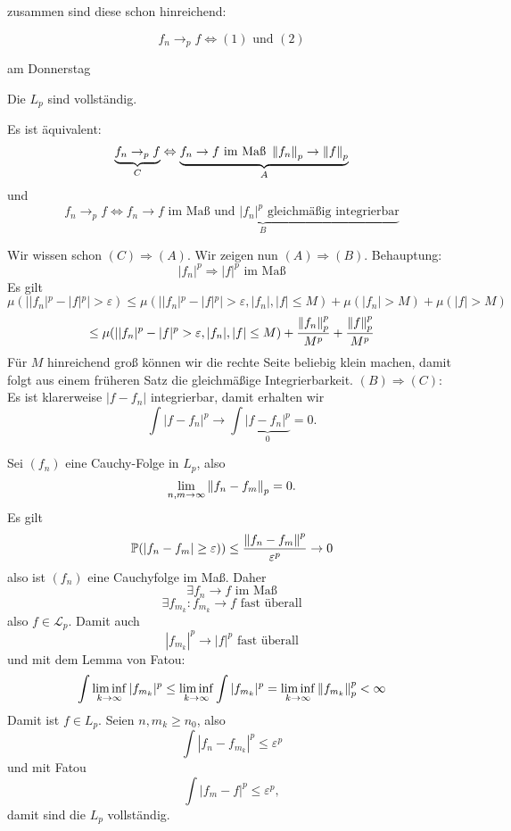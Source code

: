 	zusammen sind diese schon hinreichend:
	\begin{satz}
		\[ f_n\to_p f\Leftrightarrow (1)\text{ und }(2) \]
	\end{satz}

	\begin{bew}
		am Donnerstag
	\end{bew}

	\begin{satz} 
		Die $L_p$ sind vollständig. 
	\end{satz}

	\begin{satz} 
		Es ist äquivalent:
		\[ \underbrace{f_n\to_p f}_C\Leftrightarrow \underbrace{f_n\to f\text{ im Maß } \left\|f_n\right\|_p\to\left\|f\right\|_p}_A \]
		und
		\[ f_n\to_p f\Leftrightarrow \underbrace{f_n \to f\text{ im Maß und } |f_n|^p \text{ gleichmäßig integrierbar}}_B \]
	\end{satz}

	\begin{bew}
		Wir wissen schon $(C)\Rightarrow (A)$. \newline
		Wir zeigen nun $(A)\Rightarrow (B)$. \newline
		Behauptung: 
		\[ |f_n|^p\Rightarrow |f|^p \text{ im Maß} \]
		Es gilt
		\[ \mu(||f_n|^p-|f|^p|>\varepsilon)\le\mu(||f_n|^p-|f|^p|>\varepsilon, |f_n|, |f|\le M)+\mu(|f_n|>M)+\mu(|f|>M) \]
		\[ \le \mu(||f_n|^p-|f|^p>\varepsilon, |f_n|, |f|\le M)+\frac{\left\|f_n\right\|_p^p}{M^p}+\frac{\left\|f\right\|_p^p}{M^p} \]
		Für $M$ hinreichend groß können wir die rechte Seite beliebig klein machen, damit folgt aus einem früheren Satz die gleichmäßige Integrierbarkeit.\newline
		$(B)\Rightarrow (C)$: Es ist klarerweise $|f-f_n|$ integrierbar, damit erhalten wir
		\[ \int|f-f_n|^p\to\int\underbrace{|f-f_n|^p}_0 = 0. \]
	\end{bew}

	\begin{bew}
		Sei $(f_n)$ eine Cauchy-Folge in $L_p$, also
		\[ \lim_{n,m\to\infty}\left\|f_n-f_m\right\|_p=0. \]
		Es gilt
		\[ \mathbb{P}(|f_n-f_m|\ge\varepsilon))\le\frac{\left\|f_n-f_m\right\|^p}{\varepsilon^p}\to 0 \]
		also ist $(f_n)$ eine Cauchyfolge im Maß. Daher 
		\[ \exists f_n\to f\text{ im Maß} \]
		\[ \exists f_{m_k}: f_{m_k}\to f \text{ fast überall} \]
		also $f\in\mathcal{L}_p$. Damit auch
		\[ |f_{m_k}|^p\to|f|^p\text{ fast überall} \]
		und mit dem Lemma von Fatou:
		\[ \int\liminf_{k\to\infty}|f_{m_k}|^p\le\liminf_{k\to\infty}\int|f_{m_k}|^p = \liminf_{k\to\infty}\left\|f_{m_k}\right\|_p^p<\infty \]
		Damit ist $f\in L_p$.\newline
		Seien $n,m_k\ge n_0$, also
		\[ \int|f_n-f_{m_k}|^p\le\varepsilon^p \]
		und mit Fatou
		\[ \int |f_m-f|^p\le\varepsilon^p, \]
		damit sind die $L_p$ vollständig.  
	\end{bew}

